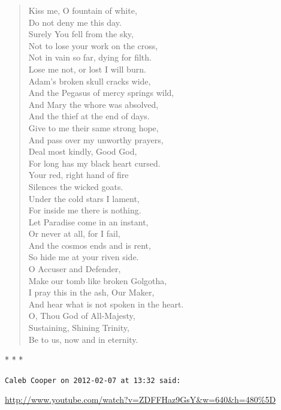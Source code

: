\begin{verse}
Kiss me, O fountain of white,\\
Do not deny me this day.\\
Surely You fell from the sky,\\
Not to lose your work on the cross,\\
Not in vain so far, dying for filth.\\
Lose me not, or lost I will burn.\\
Adam's broken skull cracks wide,\\
And the Pegasus of mercy springs wild,\\
And Mary the whore was absolved,\\
And the thief at the end of days.\\
Give to me their same strong hope,\\
And pass over my unworthy prayers,\\
Deal most kindly, Good God,\\
For long has my black heart cursed.\\
Your red, right hand of fire\\
Silences the wicked goats.\\
Under the cold stars I lament,\\
For inside me there is nothing.\\
Let Paradise come in an instant,\\
Or never at all, for I fail,\\
And the cosmos ends and is rent,\\
So hide me at your riven side.\\
O Accuser and Defender,\\
Make our tomb like broken Golgotha,\\
I pray this in the ash, Our Maker,\\
And hear what is not spoken in the heart.\\
O, Thou God of All-Majesty,\\
Sustaining, Shining Trinity,\\
Be to us, now and in eternity.
\end{verse}


\begin{center}* * *\end{center}

\begin{footnotesize}
\begin{sffamily}
\texttt{Caleb Cooper on 2012-02-07 at 13:32 said:}

\url{http://www.youtube.com/watch?v=ZDFFHaz9GsY&w=640&h=480\%5D}



\hfill

\end{sffamily}
\end{footnotesize}


